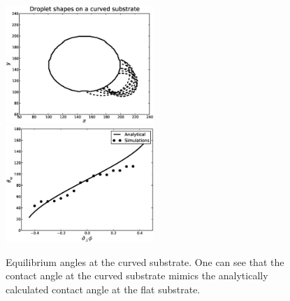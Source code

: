 \documentclass{article}
\begin{document}
\begin{figure}
\includegraphics[width=0.5\textwidth]{Figures/droplet_shapes_curved_substrates.eps}
\includegraphics[width=0.5\textwidth]{Figures/main_curve_circle.eps}\\
\caption{Equilibrium angles at the curved substrate. One can see that the contact angle at the curved substrate mimics the analytically calculated contact angle at the flat substrate. \label{fig:equilibrium:droplet:curved}}
\end{figure}
\end{document}
